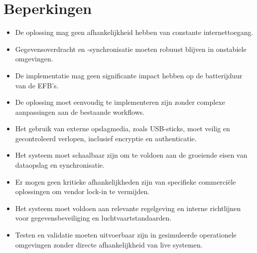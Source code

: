     \section{Beperkingen}
    \begin{itemize}
    \item De oplossing mag geen afhankelijkheid hebben van constante internettoegang.
    \item Gegevensoverdracht en -synchronisatie moeten robuust blijven in onstabiele omgevingen.
    \item De implementatie mag geen significante impact hebben op de batterijduur van de EFB's.
    \item De oplossing moet eenvoudig te implementeren zijn zonder complexe aanpassingen aan de bestaande workflows.
    \item Het gebruik van externe opslagmedia, zoals USB-sticks, moet veilig en gecontroleerd verlopen, inclusief encryptie en authenticatie.
    \item Het systeem moet schaalbaar zijn om te voldoen aan de groeiende eisen van dataopslag en synchronisatie.
    \item Er mogen geen kritieke afhankelijkheden zijn van specifieke commerciële oplossingen om vendor lock-in te vermijden.
    \item Het systeem moet voldoen aan relevante regelgeving en interne richtlijnen voor gegevensbeveiliging en luchtvaartstandaarden.
    \item Testen en validatie moeten uitvoerbaar zijn in gesimuleerde operationele omgevingen zonder directe afhankelijkheid van live systemen.
    \end{itemize}
